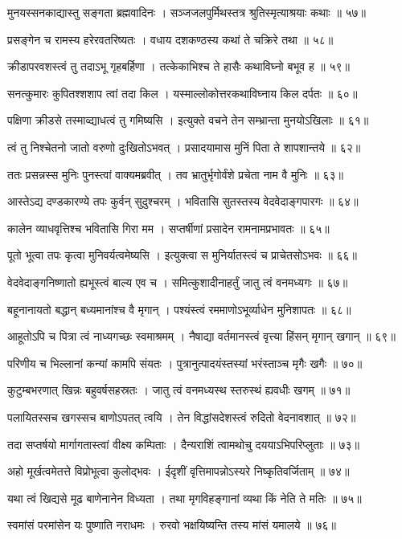 मुनयस्सनकाद्यास्तु सङ्गता ब्रह्मवादिनः ।
सञ्जजलपुर्मिथस्तत्र श्रुतिस्मृत्याश्रयाः कथाः ॥ ५७॥

प्रसङ्गेन च रामस्य हरेरवतरिष्यतः ।
वधाय दशकण्ठस्य कथां ते चक्रिरे तथा ॥ ५८॥

क्रीडापरवशस्त्वं तु तदाऽभू गृहबर्हिणा ।
तत्केकाभिश्च ते हासैः कथाविघ्नो बभूव ह ॥ ५९॥

सनत्कुमारः कुपितश्शशाप त्वां तदा किल ।
यस्माल्लोकोत्तरकथाविघ्नाय किल दर्पतः ॥ ६०॥

पक्षिणा क्रीडसे तस्माव्द्याधत्वं तु गमिष्यसि ।
इत्युक्ते वचने तेन सम्भ्रान्ता मुनयोऽखिलाः ॥ ६१॥

त्वं तु निश्चेतनो जातो वरुणो दुःखितोऽभवत् ।
प्रसादयामास मुनिं पिता ते शापशान्तये ॥ ६२॥

ततः प्रसन्नस्स मुनिः पुनस्त्वां वाक्यमब्रवीत् ।
तव भ्रातुर्भृगोर्वंशे प्रचेता नाम वै मुनिः ॥ ६३॥

आस्तेऽद्य दण्डकारण्ये तपः कुर्वन् सुदुश्चरम् ।
भवितासि सुतस्तस्य वेदवेदाङ्गपारगः ॥ ६४॥

कालेन व्याधवृत्तिश्च भवितासि गिरा मम ।
सप्तर्षीणां प्रसादेन रामनामप्रभावतः ॥ ६५॥

पूतो भूत्वा तपः कृत्वा मुनिवर्यत्वमेष्यसि ।
इत्युक्त्वा स मुनिर्यातस्त्वं च प्राचेतसोऽभवः ॥ ६६॥

वेदवेदाङ्गनिष्णातो ह्यभूस्त्वं बाल्य एव च ।
समित्कुशादीनाहर्तुं जातु त्वं वनमध्यगः ॥ ६७॥

बहूनानायतो बद्धान् बध्यमानांश्च वै मृगान् ।
पश्यंस्त्वं रममाणोऽभूर्व्याधेन मुनिशापतः ॥ ६८॥

आहूतोऽपि च पित्रा त्वं नाध्यगच्छः स्वमाश्रमम् ।
नैषाद्या वर्तमानस्त्वं वृत्त्या हिंसन् मृगान् खगान् ॥ ६९॥

परिणीय च भिल्लानां कन्यां कामपि संयतः ।
पुत्रानुत्पादयंस्तस्यां भरंस्ताञ्च मृगैः खगैः ॥ ७०॥

कुटुम्बभरणात् खिन्नः बहुवर्षसहस्रतः ।
जातु त्वं वनमध्यस्थ स्तरुस्थं ह्यवधीः खगम् ॥ ७१॥

पलायितस्सच खगस्सच बाणोऽपतत् त्वयि ।
तेन विद्धांसदेशस्त्वं रुदितो वेदनावशात् ॥ ७२॥

तदा सप्तर्षयो मार्गागतास्त्वां वीक्ष्य कम्पिताः ।
दैन्यराशिं त्वामथोचु दययाऽभिपरिप्लुताः ॥ ७३॥

अहो मूर्खत्वमेतत्ते विप्रोभूत्वा कुलोद्भवः ।
ईदृशीं वृत्तिमापन्नोऽस्यरे निष्कृतिवर्जिताम् ॥ ७४॥

यथा त्वं खिद्यसे मूढ बाणेनानेन विध्यता ।
तथा मृगविहङ्गानां व्यथा किं नेति ते मतिः ॥ ७५॥

स्वमांसं परमांसेन यः पुष्णाति नराधमः ।
रुरवो भक्षयिष्यन्ति तस्य मांसं यमालये ॥ ७६॥

